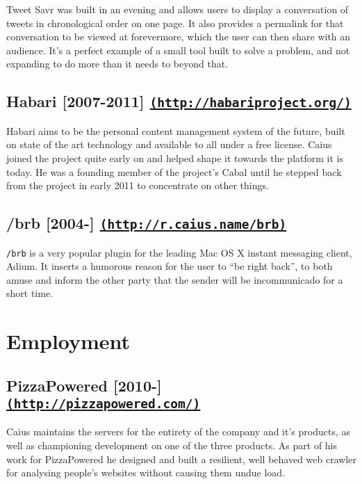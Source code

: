 \documentclass[letterpaper]{article}
\begin{document}
Tweet Savr was built in an evening and allows users to display a conversation of tweets in chronological order on one page. It also provides a permalink for that conversation to be viewed at forevermore, which the user can then share with an audience. It's a perfect example of a small tool built to solve a problem, and not expanding to do more than it needs to beyond that.


\subsection*{Habari [2007-2011] \href{http://habariproject.org/}{\tt (http://habariproject.org/)}} %
\label{sub:habari}

Habari aims to be the personal content management system of the future, built on state of the art technology and available to all under a free license. Caius joined the project quite early on and helped shape it towards the platform it is today. He was a founding member of the project's Cabal until he stepped back from the project in early 2011 to concentrate on other things.


\subsection*{/brb [2004-\the\year] \href{http://r.caius.name/brb}{\tt (http://r.caius.name/brb)}} %
\label{sub:brb}

{\tt /brb} is a very popular plugin for the leading Mac OS X instant messaging client, Adium. It inserts a humorous reason for the user to ``be right back'', to both amuse and inform the other party that the sender will be incommunicado for a short time.


\section*{Employment}

\subsection*{PizzaPowered [2010-\the\year] \href{http://pizzapowered.com/}{\tt (http://pizzapowered.com/)}} %
\label{sub:pizzapowered}

Caius maintains the servers for the entirety of the company and it's products, as well as championing development on one of the three products. As part of his work for PizzaPowered he designed and built a resilient, well behaved web crawler for analysing people's websites without causing them undue load.
\end{document}
